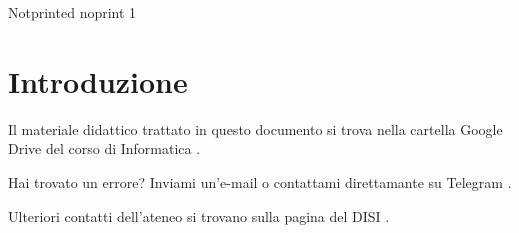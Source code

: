 \begin{ocg} [printocg = never] {Notprinted} {noprint} {1}
\section*{Introduzione}

Il materiale didattico trattato in questo documento si trova nella cartella Google Drive del corso di Informatica %
\href{https://bit.ly/drive-folder}{\ExternalLink}.

\medskip
Hai trovato un errore? Inviami un'e-mail \href{mailto:emanuele.nardi@studenti.unitn.it}{\ExternalLink} o contattami direttamante su Telegram \href{https://t.me/emanuelenardi}{\ExternalLink}.

\medskip
Ulteriori contatti dell'ateneo si trovano sulla pagina del DISI %
\href{http://offertaformativa.unitn.it/it/l/informatica/contatti-e-referenti}{\ExternalLink}.

\tableofcontents					%
\lstlistoflistings					%
%
\end{ocg}
